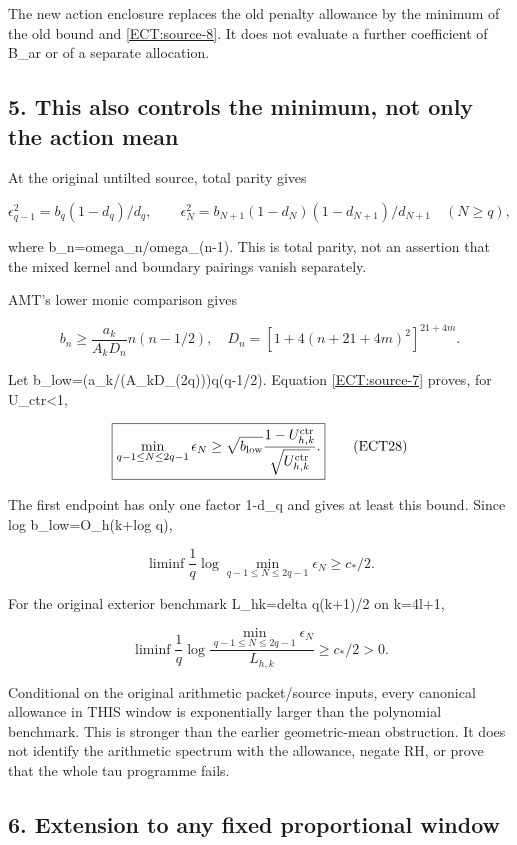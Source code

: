 \documentclass[11pt,a4paper]{article}
\begin{document}
The new action enclosure replaces the old penalty allowance by the minimum of the old bound and \eqref{ECT:source-8}. It does not evaluate a further coefficient of B\_ar or of a separate allocation.

\subsection{5. This also controls the minimum, not only the action mean}\label{ECT:this-also-controls-the-minimum-not-only-the-action-mean}

At the original untilted source, total parity gives

\[
\epsilon_{q-1}^2=b_q(1-d_q)/d_q,\qquad
\epsilon_N^2=b_{N+1}(1-d_N)(1-d_{N+1})/d_{N+1}\quad(N\ge q),
\tag{ECT26}\label{ECT:eq-26}\]

where b\_n=omega\_n/omega\_(n-1). This is total parity, not an assertion that the mixed kernel and boundary pairings vanish separately.

AMT's lower monic comparison gives

\[
b_n\ge\frac{a_k}{A_kD_n}n(n-1/2),\quad
D_n=[1+4(n+21+4m)^2]^{21+4m}.
\tag{ECT27}\label{ECT:eq-27}\]

Let b\_low=(a\_k/(A\_kD\_(2q)))q(q-1/2). Equation \eqref{ECT:source-7} proves, for U\_ctr\textless1,

\[
\boxed{\min_{q-1\le N\le2q-1}\epsilon_N
\ge\sqrt{b_{\rm low}}\frac{1-U_{h,k}^{\rm ctr}}{\sqrt{U_{h,k}^{\rm ctr}}}.}
\tag{ECT28}\label{ECT:source-9}\]

The first endpoint has only one factor 1-d\_q and gives at least this bound. Since log b\_low=O\_h(k+log q),

\[
\liminf\frac1q\log\min_{q-1\le N\le2q-1}\epsilon_N\ge c_*/2.
\tag{ECT29}\label{ECT:eq-29}\]

For the original exterior benchmark L\_hk=delta q(k+1)/2 on k=4l+1,

\[
\boxed{\liminf\frac1q\log\frac{\min_{q-1\le N\le2q-1}\epsilon_N}{L_{h,k}}
\ge c_*/2>0.}
\tag{ECT30}\label{ECT:source-10}\]

Conditional on the original arithmetic packet/source inputs, every canonical allowance in THIS window is exponentially larger than the polynomial benchmark. This is stronger than the earlier geometric-mean obstruction. It does not identify the arithmetic spectrum with the allowance, negate RH, or prove that the whole tau programme fails.

\subsection{6. Extension to any fixed proportional window}\label{ECT:extension-to-any-fixed-proportional-window}
\end{document}
